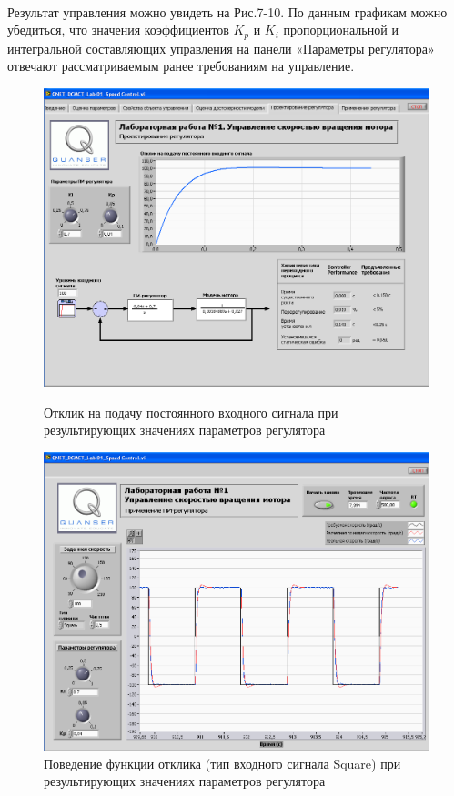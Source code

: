 \documentclass[12pt]{article}
\begin{document}
\paragraph{}
Результат управления можно увидеть на Рис.7-10. По данным графикам можно убедиться, что значения
коэффициентов $K_p$ и $K_i$ пропорциональной и интегральной
составляющих управления на панели «Параметры
регулятора» отвечают рассматриваемым ранее требованиям
на управление.
\vfill
\begin{center}
	\begin{figure}
		\centering
		\includegraphics[scale=1.6]{control_response}
		\caption{Отклик на подачу постоянного входного сигнала при результирующих значениях параметров регулятора}
		\hfill\break
		\centering
		\includegraphics[scale=1.6]{control_square}
		\caption{Поведение функции отклика (тип входного сигнала Square) при результирующих значениях параметров регулятора}
	\end{figure}
\end{center}
\end{document}
